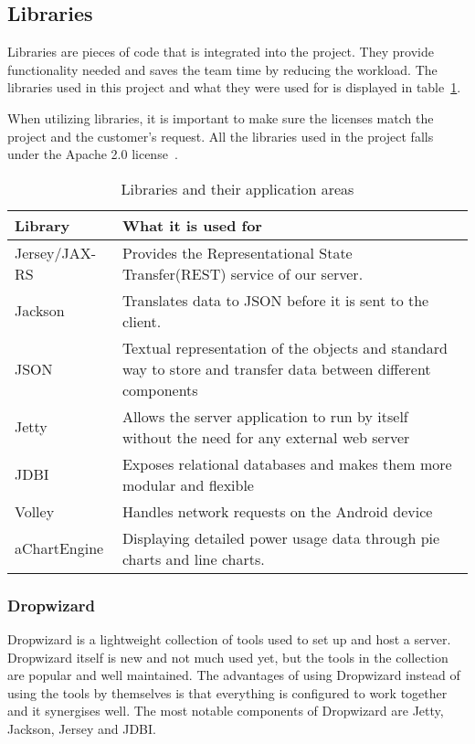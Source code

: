 \subsection{Libraries}
\label{sec:libraries}
Libraries are pieces of code that is integrated into the project. They provide functionality needed and saves the team time by reducing the workload. The libraries used in this project and what they were used for is displayed in table~\ref{tab:libs}.

When utilizing libraries, it is important to make sure the licenses match the project and the customer's request. All the libraries used in the project falls under the Apache 2.0 license~\cite{Apache}.

\begin{table}[H]
\begin{tabular}{|l|p{12.9cm}|}
\hline
\textbf{Library }& \textbf{What it is used for}\\\hline
Jersey/JAX-RS & Provides the Representational State Transfer(REST) service of our server.\\\hline
Jackson&Translates data to JSON before it is sent to the client.\\\hline
JSON&Textual representation of the objects and standard way to store and transfer data between different components\\\hline
Jetty&Allows the server application to run by itself without the need for any external web server\\\hline
JDBI&Exposes relational databases and makes them more modular and flexible\\\hline
Volley & Handles network requests on the Android device\\\hline
aChartEngine& Displaying detailed power usage data through  pie charts and line charts.\\\hline
\end{tabular}
\caption{Libraries and their application areas}
\label{tab:libs}
\end{table}

\subsubsection{Dropwizard}
Dropwizard is a lightweight collection of tools used to set up and host a server. Dropwizard itself is new and not much used yet, but the tools in the collection are popular and well maintained. 
The advantages of using Dropwizard instead of using the tools by themselves is that everything is configured to work together and it synergises well. The most notable components of Dropwizard are Jetty, Jackson, Jersey and JDBI.



